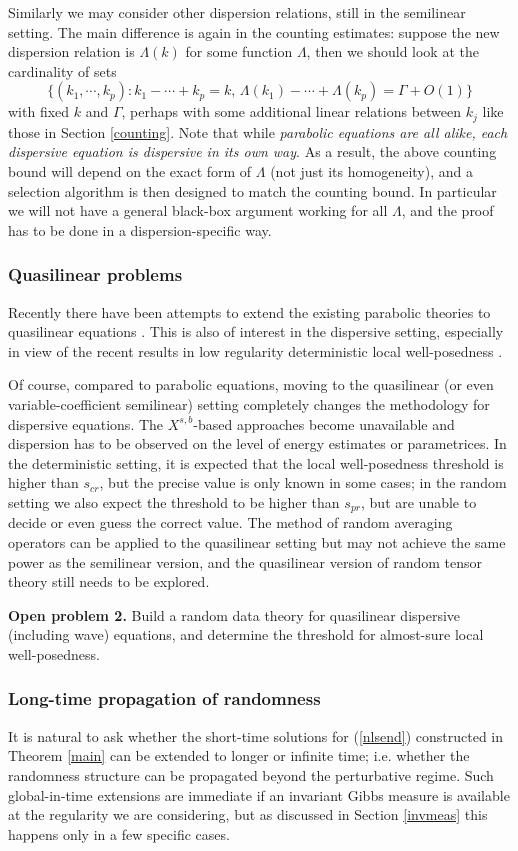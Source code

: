 \documentclass[11 pt,reqno]{amsart}
\theoremstyle{definition}
\theoremstyle{remark}
\numberwithin{equation}{section}
\begin{document}
{{Similarly we may consider other dispersion relations, still in the semilinear setting. The main difference is again in the counting estimates: suppose the new dispersion relation is $\Lambda(k)$ for some function $\Lambda$, then we should look at the cardinality of sets
\[\{(k_1,\cdots,k_p):k_1-\cdots+k_p=k,\,\Lambda(k_1)-\cdots +\Lambda(k_p)=\Gamma+O(1)\}\] with fixed $k$ and $\Gamma$, perhaps with some additional linear relations between $k_j$ like those in Section \ref{counting}. Note that while \emph{parabolic equations are all alike, each dispersive equation is dispersive in its own way}. As a result, the above counting bound will depend on the exact form of $\Lambda$ (not just its homogeneity), and a selection algorithm is then designed to match the counting bound. In particular we will not have a general black-box argument working for all $\Lambda$, and the proof has to be done in a dispersion-specific way.
\subsubsection{Quasilinear problems} Recently there have been attempts to extend the existing parabolic theories to quasilinear equations \cite{FM,GH}. This is also of interest in the dispersive setting, especially in view of the recent results in low regularity deterministic local well-posedness \cite{ABZ,KRS}.

Of course, compared to parabolic equations, moving to the quasilinear (or even variable-coefficient semilinear) setting completely changes the methodology for dispersive equations. The $X^{s,b}$-based approaches become unavailable and dispersion has to be observed on the level of energy estimates or parametrices. In the deterministic setting, it is expected that the local well-posedness threshold is higher than $s_{cr}$, but the precise value is only known in some cases; in the random setting we also expect the threshold to be higher than $s_{pr}$, but are unable to decide or even guess the correct value. The method of random averaging operators can be applied to the quasilinear setting but may not achieve the same power as the semilinear version, and the quasilinear version of random tensor theory still needs to be explored.

\textbf{Open problem 2.} Build a random data theory for quasilinear dispersive (including wave) equations, and determine the threshold for almost-sure local well-posedness.
\subsubsection{Long-time propagation of randomness} It is natural to ask whether the short-time solutions for (\ref{nlsend}) constructed in Theorem \ref{main} can be extended to longer or infinite time; i.e. whether the randomness structure can be propagated beyond the perturbative regime. Such global-in-time extensions are immediate if an invariant Gibbs measure is available at the regularity we are considering, but as discussed in Section \ref{invmeas} this happens only in a few specific cases.

}}
\end{document}
